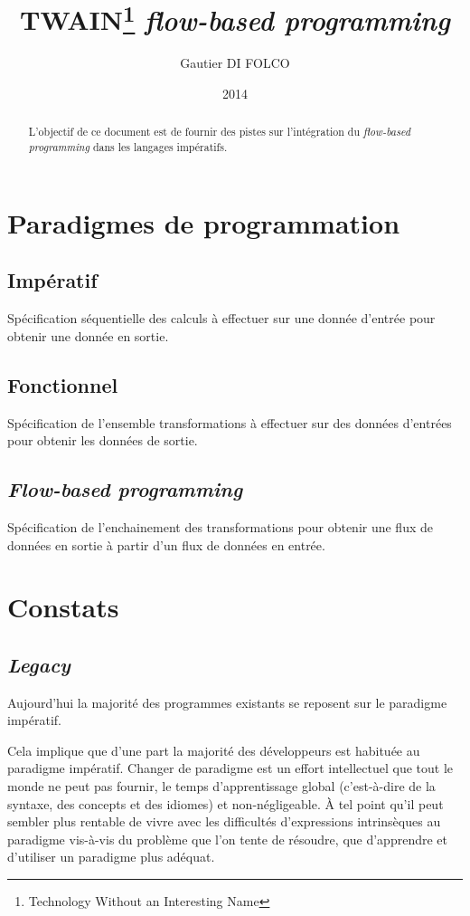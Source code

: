 \documentclass{article}
\title{TWAIN\footnote{Technology Without an Interesting Name} \emph{flow-based programming}}
\author{Gautier DI FOLCO}
\date{2014}
\begin{document}
\maketitle
\tableofcontents

\begin{abstract}
L'objectif de ce document est de fournir des pistes sur l'intégration du
\emph{flow-based programming} dans les langages impératifs.
\end{abstract}

\section{Paradigmes de programmation}
\subsection{Impératif}
Spécification séquentielle des calculs à effectuer sur une donnée d'entrée
pour obtenir une donnée en sortie.

\subsection{Fonctionnel}
Spécification de l'ensemble transformations à effectuer sur des données d'entrées
pour obtenir les données de sortie.

\subsection{\emph{Flow-based programming}}
Spécification de l'enchainement des transformations pour obtenir une flux de
données en sortie à partir d'un flux de données en entrée.

\section{Constats}
\subsection{\emph{Legacy}}
Aujourd'hui la majorité des programmes existants se reposent sur le paradigme impératif.

Cela implique que d'une part la majorité des développeurs est habituée au paradigme
impératif.
Changer de paradigme est un effort intellectuel que tout le monde ne peut pas fournir,
le temps d'apprentissage global (c'est-à-dire de la syntaxe, des concepts et des
idiomes) et non-négligeable.
À tel point qu'il peut sembler plus rentable de vivre avec les difficultés
d'expressions intrinsèques au paradigme vis-à-vis du problème que l'on tente de
résoudre, que d'apprendre et d'utiliser un paradigme plus adéquat.
\end{document}
